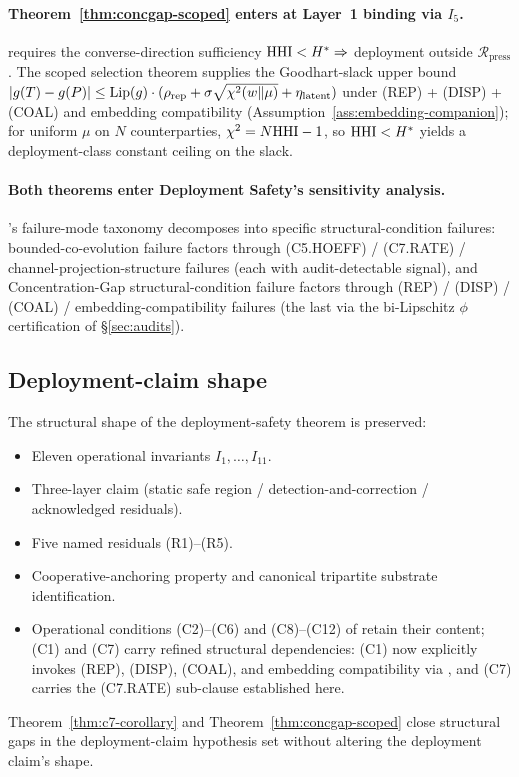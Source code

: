 \paragraph{Theorem~\ref{thm:concgap-scoped} enters at Layer~1 binding via $I_5$.}
\citep[Theorem~1, Layer~1 proof, Step~4]{lasser2026paper10} requires
the converse-direction sufficiency $\mathrm{HHI} < H^* \Rightarrow$
deployment outside $\mathcal{R}_{\mathrm{press}}$. The scoped
selection theorem supplies the Goodhart-slack upper bound
$|g(T) - g(P)| \leq \mathrm{Lip}(g) \cdot (\rho_\mathrm{rep} +
\sigma \sqrt{\chi^2(w \|\mu)} + \eta_\mathrm{latent})$ under (REP)
+ (DISP) + (COAL) and embedding compatibility
(Assumption~\ref{ass:embedding-companion}); for uniform $\mu$ on
$N$ counterparties,
$\chi^2 = N \mathrm{HHI} - 1$, so $\mathrm{HHI} < H^*$ yields a deployment-class
constant ceiling on the slack.

\paragraph{Both theorems enter Deployment Safety's sensitivity analysis.}
\citep[\S 10.2]{lasser2026paper10}'s failure-mode taxonomy
decomposes into specific structural-condition failures:
bounded-co-evolution failure factors through (C5.HOEFF) /
(C7.RATE) / channel-projection-structure failures (each with
audit-detectable signal), and Concentration-Gap structural-condition
failure factors through (REP) / (DISP) / (COAL) /
embedding-compatibility failures (the last via the bi-Lipschitz
$\phi$ certification of \S\ref{sec:audits}).

\subsection{Deployment-claim shape}

The structural shape of the deployment-safety theorem is
preserved:
\begin{itemize}
\item Eleven operational invariants $I_1, \ldots, I_{11}$.
\item Three-layer claim (static safe region /
  detection-and-correction / acknowledged residuals).
\item Five named residuals (R1)--(R5).
\item Cooperative-anchoring property and canonical tripartite
  substrate identification.
\item Operational conditions (C2)--(C6) and (C8)--(C12) of
  \citep[\S 5]{lasser2026paper10} retain their content;
  (C1) and (C7) carry refined structural dependencies: (C1) now
  explicitly invokes (REP), (DISP), (COAL), and embedding
  compatibility via \citep[Assumption~1]{lasser2026paper10}, and
  (C7) carries the (C7.RATE) sub-clause established here.
\end{itemize}

Theorem~\ref{thm:c7-corollary} and
Theorem~\ref{thm:concgap-scoped} close structural gaps in the
deployment-claim hypothesis set without altering the deployment
claim's shape.
